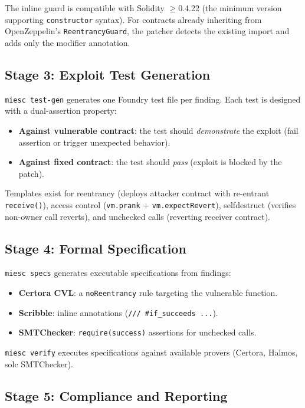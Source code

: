 \documentclass[conference]{IEEEtran}
\begin{document}
The inline guard is compatible with Solidity $\geq$0.4.22 (the minimum version supporting \texttt{constructor} syntax). For contracts already inheriting from OpenZeppelin's \texttt{ReentrancyGuard}, the patcher detects the existing import and adds only the modifier annotation.

\subsection{Stage 3: Exploit Test Generation}

\texttt{miesc test-gen} generates one Foundry test file per finding. Each test is designed with a dual-assertion property:

\begin{itemize}
    \item \textbf{Against vulnerable contract}: the test should \emph{demonstrate} the exploit (fail assertion or trigger unexpected behavior).
    \item \textbf{Against fixed contract}: the test should \emph{pass} (exploit is blocked by the patch).
\end{itemize}

Templates exist for reentrancy (deploys attacker contract with re-entrant \texttt{receive()}), access control (\texttt{vm.prank} + \texttt{vm.expectRevert}), selfdestruct (verifies non-owner call reverts), and unchecked calls (reverting receiver contract).

\subsection{Stage 4: Formal Specification}

\texttt{miesc specs} generates executable specifications from findings:
\begin{itemize}
    \item \textbf{Certora CVL}: a \texttt{noReentrancy} rule targeting the vulnerable function.
    \item \textbf{Scribble}: inline annotations (\texttt{/// \#if\_succeeds ...}).
    \item \textbf{SMTChecker}: \texttt{require(success)} assertions for unchecked calls.
\end{itemize}

\texttt{miesc verify} executes specifications against available provers (Certora, Halmos, solc SMTChecker).

\subsection{Stage 5: Compliance and Reporting}
\end{document}
